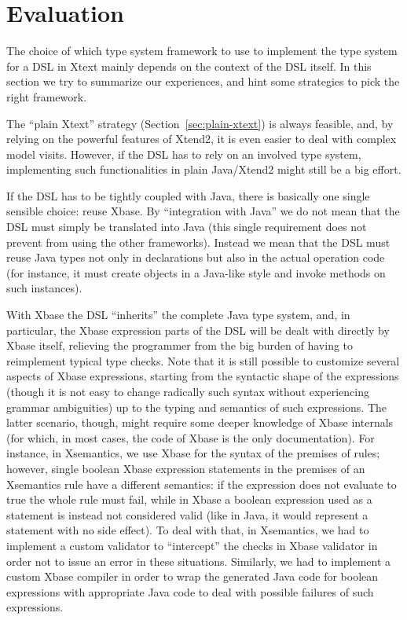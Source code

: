 \section{Evaluation}
\label{sec:evaluation}

The choice of which type system framework to use to implement the type system
for a DSL in Xtext mainly depends on the context of the DSL itself.  In this
section we try to summarize our experiences, and hint some strategies to pick
the right framework.

The ``plain Xtext'' strategy (Section~\ref{sec:plain-xtext}) is always feasible,
and, by relying on the powerful features of Xtend2, it is even easier to deal
with complex model visits.  However, if the DSL has to rely on an involved type
system, implementing such functionalities in plain Java/Xtend2 might still be a
big effort.

If the DSL has to be tightly coupled with Java, there is basically one single
sensible choice: reuse Xbase.  By ``integration with Java'' we do not mean that
the DSL must simply be translated into Java (this single requirement does not
prevent from using the other frameworks).  Instead we mean that the DSL must
reuse Java types not only in declarations but also in the actual operation code
(for instance, it must create objects in a Java-like style and invoke methods on
such instances).

With Xbase the DSL ``inherits'' the complete Java type system, and, in
particular, the Xbase expression parts of the DSL will be dealt with directly by
Xbase itself, relieving the programmer from the big burden of having to
reimplement typical type checks.  Note that it is still possible to customize
several aspects of Xbase expressions, starting from the syntactic shape of the
expressions (though it is not easy to change radically such syntax without
experiencing grammar ambiguities) up to the typing and semantics of such
expressions.  The latter scenario, though, might require some deeper knowledge
of Xbase internals (for which, in most cases, the code of Xbase is the only
documentation).  For instance, in Xsemantics, we use Xbase for the syntax of the
premises of rules; however, single boolean Xbase expression statements in the
premises of an Xsemantics rule have a different semantics: if the expression
does not evaluate to true the whole rule must fail, while in Xbase a boolean
expression used as a statement is instead not considered valid (like in Java, it
would represent a statement with no side effect).  To deal with that, in
Xsemantics, we had to implement a custom validator to ``intercept'' the checks
in Xbase validator in order not to issue an error in these situations.
Similarly, we had to implement a custom Xbase compiler in order to wrap the
generated Java code for boolean expressions with appropriate Java code to deal
with possible failures of such expressions.

